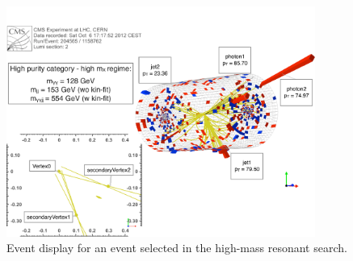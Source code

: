 \begin{figure}[htbp!]
 \begin{center}
   \includegraphics[width=0.9\textwidth]{figures/selection/display_evtHighMass.pdf}
 \end{center}
\caption{Event display for an event selected in the high-mass resonant search.}
\label{fig:display_highmass}
\end{figure}

